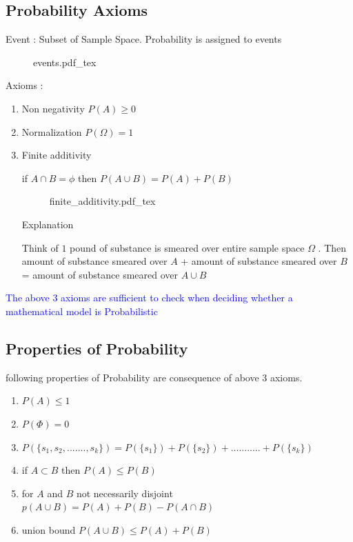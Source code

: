 \subsection{Probability Axioms}
\begin{definition*}
    Event : Subset of Sample Space. Probability is assigned to events
\end{definition*}

\begin{figure}[H]
	\centering
	\def\svgwidth{0.7\columnwidth}
	{events.pdf_tex}
\end{figure}

Axioms :	
    \begin{enumerate}

        \item Non negativity $P(A) \ge 0$
	\item Normalization $P(\Omega) = 1$ 
	\item Finite additivity 
		
		if $A \cap B = \phi$ then $P(A \cup B) = P(A) + P(B)$
		\begin{figure}[H]
			\centering
			\def\svgwidth{0.3\columnwidth}
			{finite_additivity.pdf_tex}
		\end{figure}

		Explanation

		Think of $1$ pound of substance is smeared over entire 
		sample space $\Omega$ . Then amount of substance smeared
		over $A$  + amount of substance smeared over $B$ = 
		amount of substance smeared over $A \cup B$

    \end{enumerate}
    \textcolor{blue}{The above 3 axioms are sufficient to check 
    when deciding whether a mathematical model is Probabilistic }

\subsection{Properties of Probability}
following properties of Probability are consequence of above 
3 axioms. 
\begin{enumerate}

    \item $P(A) \le 1$ 
    \item $P(\Phi) = 0$
    \item $P(\{s_{1},s_{2}, ....... ,s_{k}\}) = P(\{s_{1}\}) + P(\{s_{2}\}) + ........... + P(\{s_{k}\})$
    \item if $A \subset B$ then $P(A) \le P(B)$
    \item for $A$ and $B$ not necessarily disjoint
	    $p(A \cup B) = P(A) + P(B) - P(A \cap B)$
    \item union bound $P(A \cup B) \le P(A) + P(B)$

\end{enumerate}

